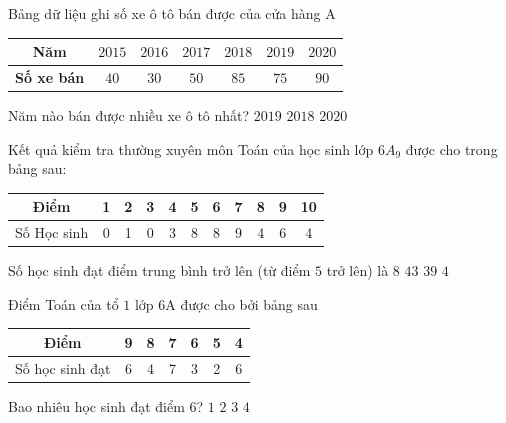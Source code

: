 \begin{ex}
	Bảng dữ liệu ghi số xe ô tô bán được của cửa hàng A
	\begin{center}
		\begin{tabular}{|c|c|c|c|c|c|c|} \hline
			\textbf{Năm} & $2015$ & $2016$ & $2017$ & $2018$ & $2019$ & $2020$ \\ \hline
			\textbf{Số xe bán} & $40$ & $30$ & $50$ & $85$ & $75$ & $90$ \\ \hline
		\end{tabular}
	\end{center}	
	Năm nào bán được nhiều xe ô tô nhất?
	{$2019$}
	{$2018$}
	{\True $2020$}
\end{ex}

\begin{ex}
	Kết quả kiểm tra thường xuyên môn Toán của học sinh lớp $6A_9$ được cho trong bảng sau:
	\begin{center}
		\begin{tabular}{|c|c|c|c|c|c|c|c|c|c|c|}
			\hline
			Điểm & 1 & 2 & 3 & 4 & 5 & 6 & 7 & 8 & 9 & 10 \\ 	
			\hline
			Số Học sinh & 0 & 1 & 0 & 3 & 8 & 8 & 9 & 4 & 6 & 4 \\ 	
			\hline		
		\end{tabular}
	\end{center}	
	Số học sinh đạt điểm trung bình trở lên (từ điểm $5$ trở lên) là
	\choice
	{$8$}
	{$43$}
	{\True $39$}
	{$4$}
\end{ex}

\begin{ex}
	Điểm Toán của tổ $1$ lớp 6A được cho bởi bảng sau
	\begin{center}
		\begin{tabular}{|c|c|c|c|c|c|c|}
			\hline Điểm&9&8&7&6&5&4\\
			\hline Số học sinh đạt&6&4&7&3&2&6\\
			\hline
		\end{tabular}
	\end{center}
	Bao nhiêu học sinh đạt điểm $6$?
	\choice
	{$1$}
	{$2$}
	{\True $3$}
	{$4$}
\end{ex}

